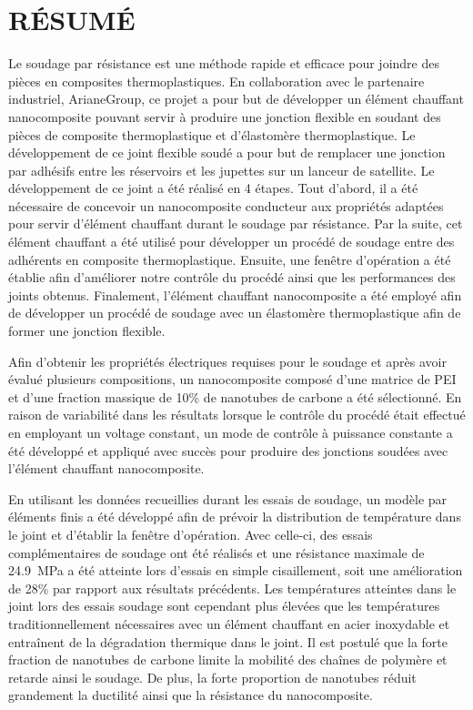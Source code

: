 %
\chapter*{RÉSUMÉ}\thispagestyle{headings}

Le soudage par résistance est une méthode rapide et efficace pour joindre des pièces en composites thermoplastiques. 
En collaboration avec le partenaire industriel, ArianeGroup, ce projet a pour but de développer un élément chauffant nanocomposite pouvant servir à produire une jonction flexible en soudant des pièces de composite thermoplastique et d'élastomère thermoplastique.
Le développement de ce joint flexible soudé a pour but de remplacer une jonction par adhésifs entre les réservoirs et les jupettes sur un lanceur de satellite. 
Le développement de ce joint a été réalisé en 4 étapes. 
Tout d'abord, il a été nécessaire de concevoir un nanocomposite conducteur aux propriétés adaptées pour servir d'élément chauffant durant le soudage par résistance. 
Par la suite, cet élément chauffant a été utilisé pour développer un procédé de soudage entre des adhérents en composite thermoplastique. 
Ensuite, une fenêtre d'opération a été établie afin d'améliorer notre contrôle du procédé ainsi que les performances des joints obtenus. 
Finalement, l'élément chauffant nanocomposite a été employé afin de développer un procédé de soudage avec un élastomère thermoplastique afin de former une jonction flexible. 

Afin d'obtenir les propriétés électriques requises pour le soudage et après avoir évalué plusieurs compositions, un nanocomposite composé d'une matrice de PEI et d'une fraction massique de 10\% de nanotubes de carbone a été sélectionné. 
En raison de variabilité dans les résultats lorsque le contrôle du procédé était effectué en employant un voltage constant, un mode de contrôle à puissance constante a été développé et appliqué avec succès pour produire des jonctions soudées avec l'élément chauffant nanocomposite.  

En utilisant les données recueillies durant les essais de soudage, un modèle par éléments finis a été développé afin de prévoir la distribution de température dans le joint et d'établir la fenêtre d'opération. 
Avec celle-ci, des essais complémentaires de soudage ont été réalisés et une résistance maximale de \SI{24.9}{\mega\pascal} a été atteinte lors d'essais en simple cisaillement, soit une amélioration de 28\% par rapport aux résultats précédents. 
Les températures atteintes dans le joint lors des essais soudage sont cependant plus élevées que les températures traditionnellement nécessaires avec un élément chauffant en acier inoxydable et entraînent de la dégradation thermique dans le joint. 
Il est postulé que la forte fraction de nanotubes de carbone limite la mobilité des chaînes de polymère et retarde ainsi le soudage. 
De plus, la forte proportion de nanotubes réduit grandement la ductilité ainsi que la résistance du nanocomposite. 

